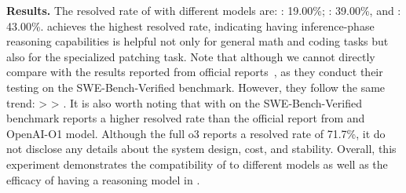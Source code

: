 
\noindent\textbf{Results.}
The resolved rate of \sys with different models are: \gpt: 19.00\%; \claude: 39.00\%, and \oo: 43.00\%.
\oo achieves the highest resolved rate, indicating having inference-phase reasoning capabilities is helpful not only for general math and coding tasks but also for the specialized patching task.
Note that although we cannot directly compare with the results reported from official reports~\cite{Claude_SWE_report,o1_SWE_report,o3_SWE_report}, as they conduct their testing on the SWE-Bench-Verified benchmark. 
However, they follow the same trend: \oo > \claude > \gpt.
It is also worth noting that \sys with \claude on the SWE-Bench-Verified benchmark reports a higher resolved rate than the official report from \claude and OpenAI-O1 model.
Although the full o3 reports a resolved rate of 71.7\%, it do not disclose any details about the system design, cost, and stability. 
Overall, this experiment demonstrates the compatibility of \sys to different models as well as the efficacy of having a reasoning model in \sys.


